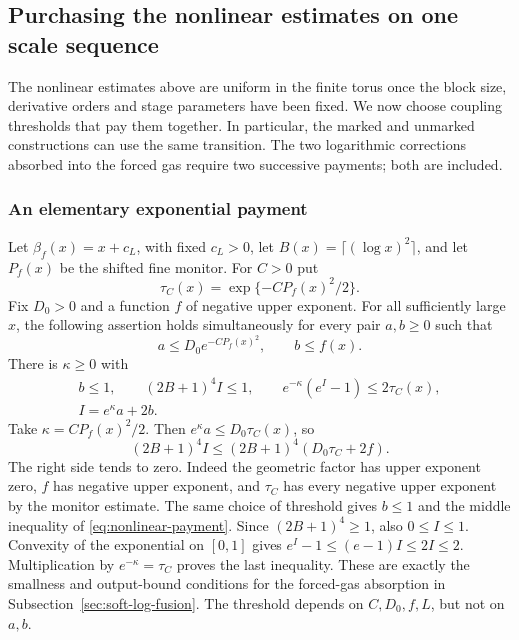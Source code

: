 \subsection{Purchasing the nonlinear estimates on one scale sequence}
\label{sec:nonlinear-payment-selection}
The nonlinear estimates above are uniform in the finite torus once
the block size, derivative orders and stage parameters have been
fixed. We now choose coupling thresholds that pay them together.
In particular, the marked and unmarked constructions can use the
same transition. The two logarithmic corrections absorbed into the
forced gas require two successive payments; both are included.

\subsubsection{An elementary exponential payment}
Let $\beta_f(x)=x+c_L$, with fixed $c_L>0$, let
$B(x)=\lceil(\log x)^2\rceil$, and let $P_f(x)$ be the shifted
fine monitor. For $C>0$ put
\[
             \tau_C(x)=\exp\{-CP_f(x)^2/2\}.
\]
Fix $D_0>0$ and a function $f$ of negative upper exponent. For all
sufficiently large $x$, the following assertion holds simultaneously
for every pair $a,b\ge0$ such that
\[
             a\le D_0 e^{-CP_f(x)^2},\qquad b\le f(x).
\]
There is $\kappa\ge0$ with
\begin{equation}\label{eq:nonlinear-payment}
 \begin{gathered}
 b\le1,\qquad (2B+1)^4 I\le1,\qquad
 e^{-\kappa}(e^I-1)\le2\tau_C(x),\\
                    I=e^\kappa a+2b.
 \end{gathered}
\end{equation}
Take $\kappa=CP_f(x)^2/2$. Then
$e^\kappa a\le D_0\tau_C(x)$, so
\[
          (2B+1)^4I\le(2B+1)^4(D_0\tau_C+2f).
\]
The right side tends to zero. Indeed the geometric factor has
upper exponent zero, $f$ has negative upper exponent, and
$\tau_C$ has every negative upper exponent by the monitor estimate.
The same choice of threshold gives $b\le1$ and the middle inequality
of \eqref{eq:nonlinear-payment}. Since $(2B+1)^4\ge1$, also
$0\le I\le1$. Convexity of the exponential on $[0,1]$ gives
$e^I-1\le(e-1)I\le2I\le2$. Multiplication by
$e^{-\kappa}=\tau_C$ proves the last inequality.
These are exactly the smallness and output-bound conditions for
the forced-gas absorption in Subsection~\ref{sec:soft-log-fusion}.
The threshold depends on $C,D_0,f,L$, but not on $a,b$.

